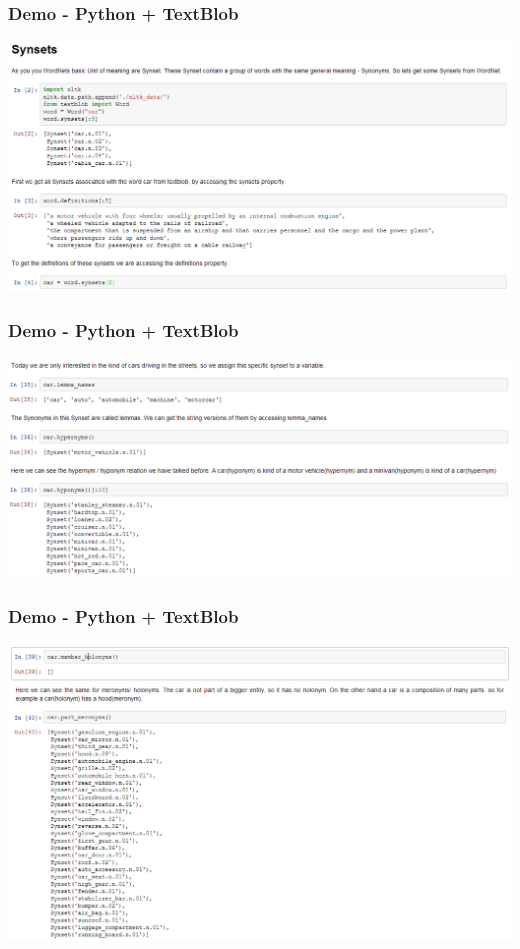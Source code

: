 \begin{frame}
\frametitle{Demo - Python + TextBlob}
\includegraphics[scale=0.29]{img/wordnet_ip1.PNG}\\
\end{frame}

\begin{frame}
\frametitle{Demo - Python + TextBlob}
\includegraphics[scale=0.29]{img/wordnet_ip2.PNG}\\
\end{frame}

\begin{frame}
\frametitle{Demo - Python + TextBlob}
\includegraphics[scale=0.29]{img/wordnet_ip3.PNG}\\
\end{frame}

